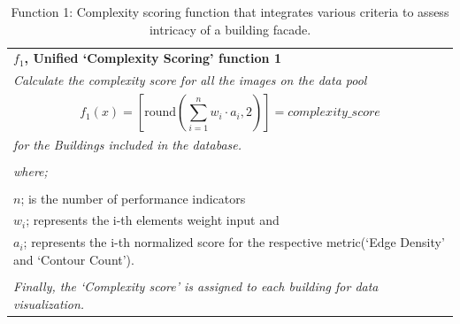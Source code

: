 \begin{table}[htb]
    \caption{Function 1: Complexity scoring function that integrates various criteria to assess intricacy of a building facade.}
    \label{tab:ComplexityScoreFunction_table}
    \centering
    \small
    \begin{tabular}{|p{8cm}|}
    \hline
        \textbf{\(f_1\), Unified `Complexity Scoring' function 1}\\
        \textit{Calculate the complexity score for all the images on the data pool}
        \\
        \begin{equation}
            f_1(x) = \left[ \mathrm{round}\left(\sum_{i=1}^{n} w_i \cdot a_i, 2\right) \right] = complexity\_score
        \label{eq:F1_ComplexityScoreFunction}
        \end{equation}

        \\
        \textit{ for the Buildings included in the database.}\\
        \\
        \textit{where;} \\
        \\
        \(n \); is the number of performance indicators \\
        \(w_i \); represents the i-th elements weight input and \\
        \(a_i \); represents the i-th normalized score for the respective metric(`Edge Density' and `Contour Count').\\
        \\

        \textit{Finally, the `Complexity score' is assigned to each building for data visualization.}\\
    \hline
    \end{tabular}
\end{table}


